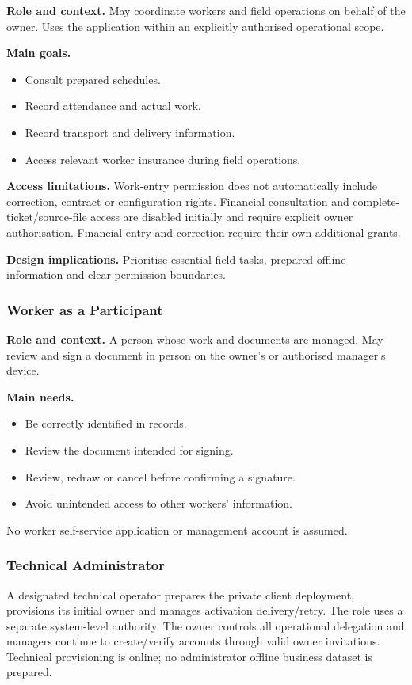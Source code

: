 \textbf{Role and context.}
May coordinate workers and field operations
on behalf of the owner.
Uses the application within an explicitly
authorised operational scope.

\textbf{Main goals.}
\begin{itemize}
    \item Consult prepared schedules.
    \item Record attendance and actual work.
    \item Record transport and delivery information.
    \item Access relevant worker insurance
    during field operations.
\end{itemize}

\textbf{Access limitations.}
Work-entry permission does not automatically include correction, contract or configuration rights. Financial consultation and complete-ticket/source-file access are disabled initially and require explicit owner authorisation. Financial entry and correction require their own additional grants.

\textbf{Design implications.}
Prioritise essential field tasks,
prepared offline information
and clear permission boundaries.

\subsubsection{Worker as a Participant}

\textbf{Role and context.}
A person whose work and documents are managed.
May review and sign a document in person
on the owner's or authorised manager's device.

\textbf{Main needs.}
\begin{itemize}
    \item Be correctly identified in records.
    \item Review the document intended for signing.
    \item Review, redraw or cancel
    before confirming a signature.
    \item Avoid unintended access
    to other workers' information.
\end{itemize}

No worker self-service application
or management account is assumed.

\subsubsection{Technical Administrator}
A designated technical operator prepares the private client deployment, provisions
its initial owner and manages activation delivery/retry. The role uses a separate
system-level authority. The owner controls all operational delegation and managers
continue to create/verify accounts through valid owner invitations. Technical
provisioning is online; no administrator offline business dataset is prepared.

